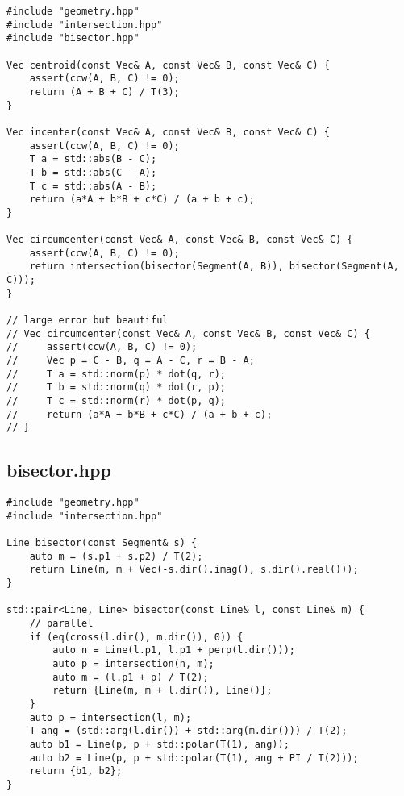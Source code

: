 \begin{small}
\begin{markdown}

\end{markdown}
\end{small}

\begin{lstlisting}
#include "geometry.hpp"
#include "intersection.hpp"
#include "bisector.hpp"

Vec centroid(const Vec& A, const Vec& B, const Vec& C) {
    assert(ccw(A, B, C) != 0);
    return (A + B + C) / T(3);
}

Vec incenter(const Vec& A, const Vec& B, const Vec& C) {
    assert(ccw(A, B, C) != 0);
    T a = std::abs(B - C);
    T b = std::abs(C - A);
    T c = std::abs(A - B);
    return (a*A + b*B + c*C) / (a + b + c);
}

Vec circumcenter(const Vec& A, const Vec& B, const Vec& C) {
    assert(ccw(A, B, C) != 0);
    return intersection(bisector(Segment(A, B)), bisector(Segment(A, C)));
}

// large error but beautiful
// Vec circumcenter(const Vec& A, const Vec& B, const Vec& C) {
//     assert(ccw(A, B, C) != 0);
//     Vec p = C - B, q = A - C, r = B - A;
//     T a = std::norm(p) * dot(q, r);
//     T b = std::norm(q) * dot(r, p);
//     T c = std::norm(r) * dot(p, q);
//     return (a*A + b*B + c*C) / (a + b + c);
// }

\end{lstlisting}

\subsection{bisector.hpp}

\begin{small}
\begin{markdown}

\end{markdown}
\end{small}

\begin{lstlisting}
#include "geometry.hpp"
#include "intersection.hpp"

Line bisector(const Segment& s) {
    auto m = (s.p1 + s.p2) / T(2);
    return Line(m, m + Vec(-s.dir().imag(), s.dir().real()));
}

std::pair<Line, Line> bisector(const Line& l, const Line& m) {
    // parallel
    if (eq(cross(l.dir(), m.dir()), 0)) {
        auto n = Line(l.p1, l.p1 + perp(l.dir()));
        auto p = intersection(n, m);
        auto m = (l.p1 + p) / T(2);
        return {Line(m, m + l.dir()), Line()};
    }
    auto p = intersection(l, m);
    T ang = (std::arg(l.dir()) + std::arg(m.dir())) / T(2);
    auto b1 = Line(p, p + std::polar(T(1), ang));
    auto b2 = Line(p, p + std::polar(T(1), ang + PI / T(2)));
    return {b1, b2};
}

\end{lstlisting}

